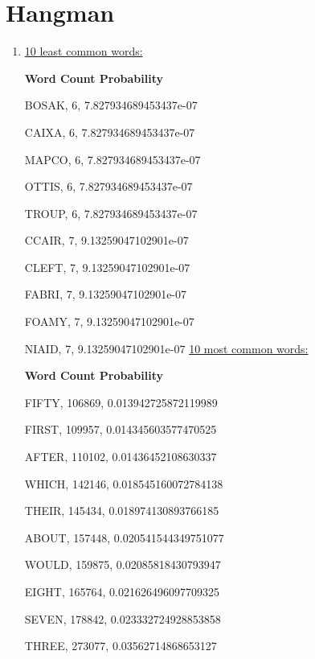 \documentclass[11]{article}
\begin{document}
\section{Hangman}
\begin{enumerate}[label=(\alph*)]
\item
\underline{10 least common words:}

\textbf{Word    Count      Probability}

BOSAK, 6, 7.827934689453437e-07

CAIXA, 6, 7.827934689453437e-07

MAPCO, 6, 7.827934689453437e-07

OTTIS, 6, 7.827934689453437e-07

TROUP, 6, 7.827934689453437e-07

CCAIR, 7, 9.13259047102901e-07

CLEFT, 7, 9.13259047102901e-07

FABRI, 7, 9.13259047102901e-07

FOAMY, 7, 9.13259047102901e-07

NIAID, 7, 9.13259047102901e-07
\bigbreak
\underline{10 most common words:}

\textbf{Word    Count      Probability}

FIFTY, 106869, 0.013942725872119989

FIRST, 109957, 0.014345603577470525

AFTER, 110102, 0.01436452108630337

WHICH, 142146, 0.018545160072784138

THEIR, 145434, 0.018974130893766185


ABOUT, 157448, 0.020541544349751077

WOULD, 159875, 0.02085818430793947

EIGHT, 165764, 0.021626496097709325

SEVEN, 178842, 0.023332724928853858

THREE, 273077, 0.03562714868653127


\end{enumerate}
\end{document}
